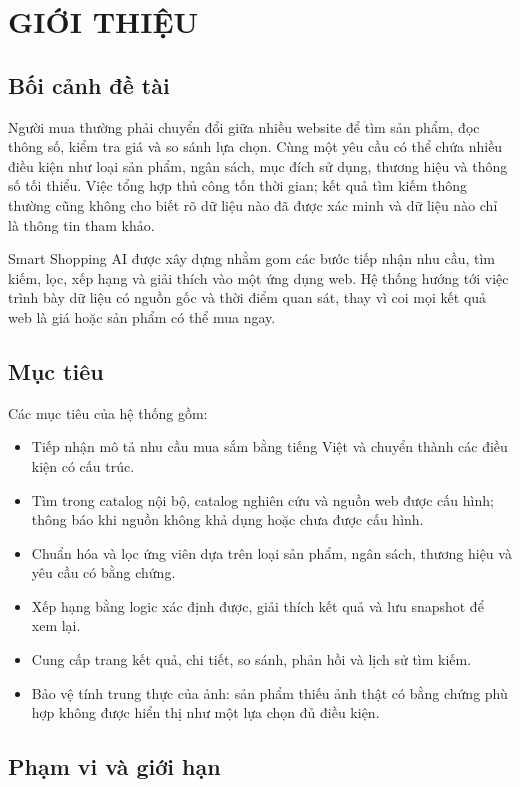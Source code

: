 \chapter{GIỚI THIỆU}

\section{Bối cảnh đề tài}

Người mua thường phải chuyển đổi giữa nhiều website để tìm sản phẩm, đọc thông số, kiểm tra giá và so sánh lựa chọn. Cùng một yêu cầu có thể chứa nhiều điều kiện như loại sản phẩm, ngân sách, mục đích sử dụng, thương hiệu và thông số tối thiểu. Việc tổng hợp thủ công tốn thời gian; kết quả tìm kiếm thông thường cũng không cho biết rõ dữ liệu nào đã được xác minh và dữ liệu nào chỉ là thông tin tham khảo.

Smart Shopping AI được xây dựng nhằm gom các bước tiếp nhận nhu cầu, tìm kiếm, lọc, xếp hạng và giải thích vào một ứng dụng web. Hệ thống hướng tới việc trình bày dữ liệu có nguồn gốc và thời điểm quan sát, thay vì coi mọi kết quả web là giá hoặc sản phẩm có thể mua ngay.

\section{Mục tiêu}

Các mục tiêu của hệ thống gồm:
\begin{itemize}
  \item Tiếp nhận mô tả nhu cầu mua sắm bằng tiếng Việt và chuyển thành các điều kiện có cấu trúc.
  \item Tìm trong catalog nội bộ, catalog nghiên cứu và nguồn web được cấu hình; thông báo khi nguồn không khả dụng hoặc chưa được cấu hình.
  \item Chuẩn hóa và lọc ứng viên dựa trên loại sản phẩm, ngân sách, thương hiệu và yêu cầu có bằng chứng.
  \item Xếp hạng bằng logic xác định được, giải thích kết quả và lưu snapshot để xem lại.
  \item Cung cấp trang kết quả, chi tiết, so sánh, phản hồi và lịch sử tìm kiếm.
  \item Bảo vệ tính trung thực của ảnh: sản phẩm thiếu ảnh thật có bằng chứng phù hợp không được hiển thị như một lựa chọn đủ điều kiện.
\end{itemize}

\section{Phạm vi và giới hạn}

